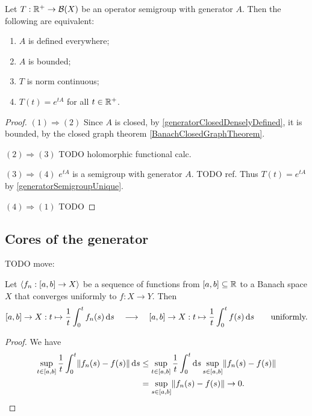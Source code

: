 \begin{proposition} \label{boundedGenerator}
Let $T: \mathbb{R}^+\to \operatorname{\mathcal{B}}(X)$ be an operator semigroup with generator $A$. Then the following are equivalent:
\begin{enumerate}
\item $A$ is defined everywhere;
\item $A$ is bounded;
\item $T$ is norm continuous;
\item $T(t) = e^{tA}$ for all $t\in\mathbb{R} ^+$.
\end{enumerate}
\end{proposition}
\begin{proof}
$(1) \Rightarrow (2)$ Since $A$ is closed, by \ref{generatorClosedDenselyDefined}, it is bounded, by the closed graph theorem \ref{BanachClosedGraphTheorem}.

$(2) \Rightarrow (3)$ TODO holomorphic functional calc.

$(3) \Rightarrow (4)$ $e^{tA}$ is a semigroup with generator $A$. TODO ref. Thus $T(t) = e^{tA}$ by \ref{generatorSemigroupUnique}.

$(4) \Rightarrow (1)$ TODO
\end{proof}

\subsection{Cores of the generator}
TODO move:
\begin{lemma} \label{uniformContinuityAverage}
Let $\left\langle f_n: [a,b]\to X \right\rangle$ be a sequence of functions from $[a,b]\subseteq \mathbb{R}$ to a Banach space $X$ that converges uniformly to $f: X\to Y$. Then
\[ [a,b]\to X: t\mapsto \frac{1}{t}\int_{0}^tf_n(s)\operatorname{d \!}{s} \quad\longrightarrow\quad [a,b]\to X: t\mapsto \frac{1}{t}\int_{0}^tf(s)\operatorname{d \!}{s} \qquad \text{uniformly.} \]
\end{lemma}
\begin{proof}
We have
\begin{align*}
\sup_{t\in[a,b]}\frac{1}{t}\int_0^t \lVert f_n(s) - f(s)\rVert\operatorname{d \!}{s} &\leq \sup_{t\in[a,b]}\frac{1}{t}\int_0^t \operatorname{d \!}{s}\sup_{s\in [a,b]} \lVert f_n(s) - f(s)\rVert \\
&= \sup_{s\in [a,b]} \lVert f_n(s) - f(s)\rVert \to 0.
\end{align*}
\end{proof}

